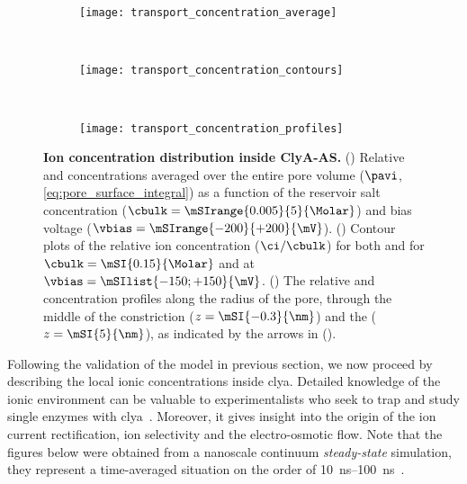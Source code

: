 %
\begin{figure*}[p]
  \centering

  \begin{subfigure}[t]{9cm}
    \centering
    \caption{}\vspace{-3mm}\label{fig:transport_concentration_average}
    \texttt{[image: transport\_concentration\_average]}
  \end{subfigure}
  \\
  \begin{subfigure}[t]{11.5cm}
    \centering
    \caption{}\vspace{-3mm}\label{fig:transport_concentration_contours}
    \texttt{[image: transport\_concentration\_contours]}
  \end{subfigure}
  \\
  \begin{subfigure}[t]{11.5cm}
    \centering
    \caption{}\vspace{-3mm}\label{fig:transport_concentration_profiles}
    \texttt{[image: transport\_concentration\_profiles]}
  \end{subfigure}

  \caption[Ion concentration distribution inside {ClyA-AS}.]%
  {%
    \textbf{Ion concentration distribution inside {ClyA-AS}.}
    ()
    Relative \Na{} and \Cl{} concentrations averaged over the entire pore volume ($\pavi$,
    \cref{eq:pore_surface_integral}) as a function of the reservoir salt concentration ($\cbulk =
    \mSIrange{0.005}{5}{\Molar}$) and bias voltage ($\vbias = \mSIrange{-200}{+200}{\mV}$).
    ()
    Contour plots of the relative ion concentration ($\ci/\cbulk$) for both \Na{} and \Cl{} for $\cbulk =
    \mSI{0.15}{\Molar}$ and at $\vbias = \mSIlist{-150;+150}{\mV}$.
    ()
    The relative \Na{} and \Cl{} concentration profiles along the radius of the pore, through the middle of
    the constriction ($z = \mSI{-0.3}{\nm}$) and the \lumen{} ($z = \mSI{5}{\nm}$), as indicated by the arrows
    in ().
    }\label{fig:transport_concentration}
\end{figure*}
%


Following the validation of the model in previous section, we now proceed by describing the local ionic
concentrations inside \gls{clya}. Detailed knowledge of the ionic environment can be valuable to
experimentalists who seek to trap and study single enzymes with
\gls{clya}~\cite{Soskine-Biesemans-2015,VanMeervelt-2017,Galenkamp-2018}. Moreover, it gives insight into the
origin of the ion current rectification, ion selectivity and the electro-osmotic flow. Note that the figures
below were obtained from a nanoscale continuum \emph{steady-state} simulation, they represent a time-averaged
situation on the order of \SIrange{10}{100}{\ns}~\cite{Im-2002}.


